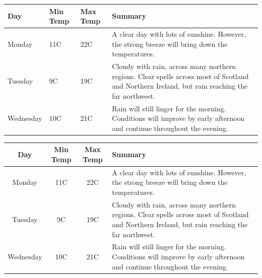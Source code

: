 \begin{table}[t]
    \centering
    \begin{tabular}{ l  l  l  p{5cm}}
        \hline
        Day       & Min Temp & Max Temp & Summary                                                      \\ \hline
        Monday    & 11C      & 22C      & A clear day with lots of sunshine.
        However, the strong breeze will bring down the temperatures.                                   \\ \hline
        Tuesday   & 9C       & 19C      & Cloudy with rain, across many northern regions. Clear spells
        across most of Scotland and Northern Ireland,
        but rain reaching the far northwest.                                                           \\ \hline
        Wednesday & 10C      & 21C      & Rain will still linger for the morning.
        Conditions will improve by early afternoon and continue
        throughout the evening.                                                                        \\
        \hline
    \end{tabular}
\end{table}







%


\begin{table}[t]
    \centering
    \begin{tabularx}{\textwidth}{ cccX }
        \hline
        Day       & Min Temp & Max Temp & Summary                                                      \\ \hline
        Monday    & 11C      & 22C      & A clear day with lots of sunshine.
        However, the strong breeze will bring down the temperatures.                                   \\ \hline
        Tuesday   & 9C       & 19C      & Cloudy with rain, across many northern regions. Clear spells
        across most of Scotland and Northern Ireland,
        but rain reaching the far northwest.                                                           \\ \hline
        Wednesday & 10C      & 21C      & Rain will still linger for the morning.
        Conditions will improve by early afternoon and continue
        throughout the evening.                                                                        \\
        \hline
    \end{tabularx}
\end{table}



